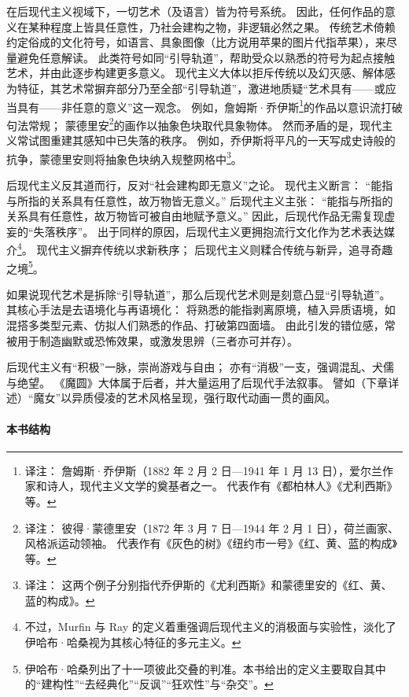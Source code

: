在后现代主义视域下，一切艺术（及语言）皆为符号系统。
因此，任何作品的意义在某种程度上皆具任意性，乃社会建构之物，非逻辑必然之果。
传统艺术倚赖约定俗成的文化符号，如语言、具象图像（比方说用苹果的图片代指苹果），来尽量避免任意解读。
此类符号如同“引导轨道”，帮助受众以熟悉的符号为起点接触艺术，并由此逐步构建更多意义。
现代主义大体以拒斥传统以及幻灭感、解体感为特征，其艺术常摒弃部分乃至全部“引导轨道”，激进地质疑“艺术具有——或应当具有——非任意的意义”这一观念。
例如，詹姆斯·乔伊斯\footnote{%
    译注：
    詹姆斯·乔伊斯（1882 年 2 月 2 日—1941 年 1 月 13 日），爱尔兰作家和诗人，现代主义文学的奠基者之一。
    代表作有《都柏林人》《尤利西斯》等。
}的作品以意识流打破句法常规；
蒙德里安\footnote{%
    译注：
    彼得·蒙德里安（1872 年 3 月 7 日—1944 年 2 月 1 日），荷兰画家、风格派运动领袖。
    代表作有《灰色的树》《纽约市一号》《红、黄、蓝的构成》等。
}的画作以抽象色块取代具象物体。
然而矛盾的是，现代主义常试图重建其感知中已失落的秩序\cite{murfin1997modernism}。
例如，乔伊斯将平凡的一天写成史诗般的抗争，蒙德里安则将抽象色块纳入规整网格中\footnote{%
    译注：
    这两个例子分别指代乔伊斯的《尤利西斯》和蒙德里安的《红、黄、蓝的构成》。
}。

后现代主义反其道而行，反对“社会建构即无意义”之论。
现代主义断言：
“能指与所指的关系具有任意性，故万物皆无意义。”
后现代主义主张：
“能指与所指的关系具有任意性，故万物皆可被自由地赋予意义。”
因此，后现代作品无需复现虚妄的“失落秩序”。
出于同样的原因，后现代主义更拥抱流行文化作为艺术表达媒介\footnote{%
    不过，Murfin 与 Ray 的定义着重强调后现代主义的消极面与实验性，淡化了伊哈布·哈桑视为其核心特征的多元主义。
}\cite{murfin1997postmodernism}。
现代主义摒弃传统以求新秩序；
后现代主义则糅合传统与新异，追寻奇趣之境\footnote{%
    伊哈布·哈桑列出了十一项彼此交叠的判准。本书给出的定义主要取自其中的“建构性”“去经典化”“反讽”“狂欢性”与“杂交”。
}\cite{hassan1987pluralism}。

如果说现代艺术是拆除“引导轨道”，那么后现代艺术则是刻意凸显“引导轨道”。
其核心手法是去语境化与再语境化：
将熟悉的能指剥离原境，植入异质语境，如混搭多类型元素、仿拟人们熟悉的作品、打破第四面墙\cite{hassan1987pluralism}。
由此引发的错位感，常被用于制造幽默或恐怖效果，或激发思辨（三者亦可并存）。

后现代主义有“积极”一脉，崇尚游戏与自由；
亦有“消极”一支，强调混乱、犬儒与绝望\cite{rosenau1996affirmatives-skeptics}。
《魔圆》大体属于后者，并大量运用了后现代手法叙事。
譬如（下章详述）“魔女”以异质侵凌的艺术风格呈现，强行取代动画一贯的画风。
\paragraph{本书结构}

